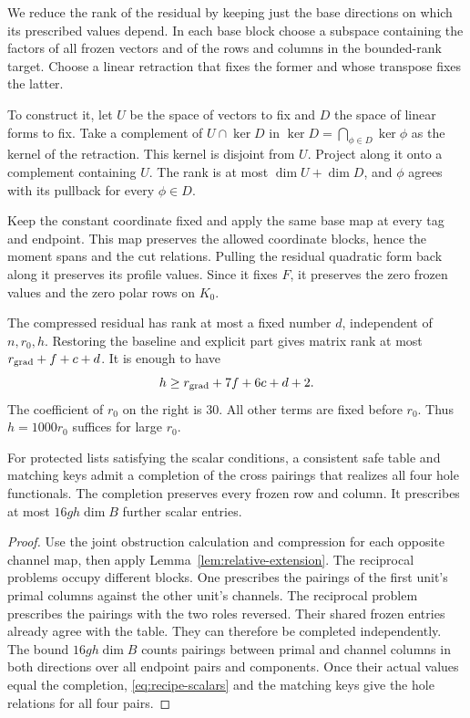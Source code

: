 We reduce the rank of the residual by keeping just the base directions
on which its prescribed values depend.
In each base block choose a subspace containing the factors of all frozen
vectors and of the rows and columns in the bounded-rank target. Choose a
linear retraction that fixes the former and whose transpose fixes the
latter.

To construct it, let \(U\) be the space of vectors to fix and \(D\) the
space of linear forms to fix. Take a complement of \(U\cap\ker D\) in
\(\ker D=\bigcap_{\phi\in D}\ker\phi\) as the kernel of the retraction.
This kernel is disjoint from \(U\). Project along it onto a complement
containing \(U\). The rank is at most \(\dim U+\dim D\), and
\(\phi\) agrees with its pullback for every \(\phi\in D\).

Keep the constant
coordinate fixed and apply the same base map at every tag and endpoint.
This map preserves the allowed coordinate blocks, hence the moment spans
and the cut relations. Pulling the residual quadratic form back along it
preserves its profile values. Since it fixes \(F\), it preserves the zero
frozen values and the zero polar rows on \(K_0\).

The compressed residual has rank at most a fixed number \(d\), independent
of \(n,r_0,h\). Restoring the baseline and explicit part gives matrix rank
at most \(r_{\rm grad}+f+c+d\). It is enough to have
\begin{equation}\label{eq:channel-room}
 h\ge r_{\rm grad}+7f+6c+d+2.
\end{equation}
The coefficient of \(r_0\) on the right is 30. All other terms are fixed
before \(r_0\). Thus \(h=1000r_0\) suffices for large \(r_0\).

\begin{theorem}[Realization]\label{thm:gradient-realization}
For protected lists satisfying the scalar conditions, a consistent safe
table and matching keys admit a completion of the cross pairings that
realizes all four hole functionals. The completion preserves every frozen
row and column. It prescribes at most \(16gh\dim B\) further scalar entries.
\end{theorem}
\begin{proof}
Use the joint obstruction calculation and compression for each opposite
channel map, then apply Lemma~\ref{lem:relative-extension}. The reciprocal
problems occupy different blocks. One prescribes the pairings of the
first unit's primal columns against the other unit's channels. The
reciprocal problem prescribes the pairings with the two roles reversed. Their shared
frozen entries already agree with the table. They can therefore be completed
independently. The bound \(16gh\dim B\) counts pairings between primal and channel
columns in both directions over all endpoint pairs and components. Once their actual values equal the
completion, \eqref{eq:recipe-scalars} and the matching keys give the hole
relations for all four pairs.
\end{proof}

